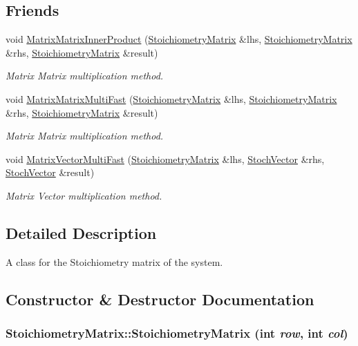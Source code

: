 \subsection*{Friends}
\begin{CompactItemize}
\item 
void \hyperlink{class_stoichiometry_matrix_10424efd5c6593638e200178321d9cd9}{MatrixMatrixInnerProduct} (\hyperlink{class_stoichiometry_matrix}{StoichiometryMatrix} \&lhs, \hyperlink{class_stoichiometry_matrix}{StoichiometryMatrix} \&rhs, \hyperlink{class_stoichiometry_matrix}{StoichiometryMatrix} \&result)
\begin{CompactList}\small\item\em Matrix Matrix multiplication method. \item\end{CompactList}\item 
void \hyperlink{class_stoichiometry_matrix_94eca91b8577196b287e2126626a1738}{MatrixMatrixMultiFast} (\hyperlink{class_stoichiometry_matrix}{StoichiometryMatrix} \&lhs, \hyperlink{class_stoichiometry_matrix}{StoichiometryMatrix} \&rhs, \hyperlink{class_stoichiometry_matrix}{StoichiometryMatrix} \&result)
\begin{CompactList}\small\item\em Matrix Matrix multiplication method. \item\end{CompactList}\item 
void \hyperlink{class_stoichiometry_matrix_cbfe448187d00443c3a60c2c2c6c3064}{MatrixVectorMultiFast} (\hyperlink{class_stoichiometry_matrix}{StoichiometryMatrix} \&lhs, \hyperlink{class_stoch_vector}{StochVector} \&rhs, \hyperlink{class_stoch_vector}{StochVector} \&result)
\begin{CompactList}\small\item\em Matrix Vector multiplication method. \item\end{CompactList}\end{CompactItemize}


\subsection{Detailed Description}
A class for the Stoichiometry matrix of the system. 



\subsection{Constructor \& Destructor Documentation}
\hypertarget{class_stoichiometry_matrix_dd6e1262d67ff54b8c9b2c1fadadf02f}{
\subsubsection{\setlength{\rightskip}{0pt plus 5cm}StoichiometryMatrix::StoichiometryMatrix (int {\em row}, \/  int {\em col})}}
\label{class_stoichiometry_matrix_dd6e1262d67ff54b8c9b2c1fadadf02f}


